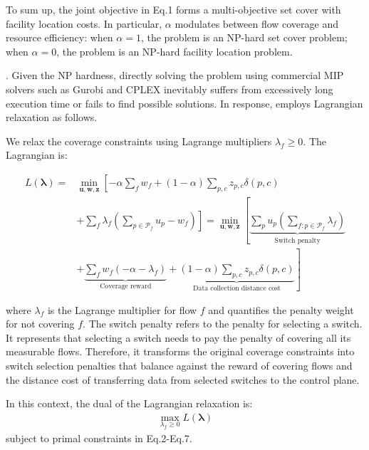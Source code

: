 To sum up, the joint objective in Eq.1 forms a multi-objective set cover with facility location costs. In particular, $\alpha$ modulates between flow coverage and resource efficiency: when $\alpha=1$, the problem is an NP-hard set cover problem; when $\alpha=0$, the problem is an NP-hard facility location problem.  

. Given the NP hardness, directly solving the problem using commercial MIP solvers such as Gurobi \cite{gurobi} and CPLEX \cite{cplex} inevitably suffers from excessively long execution time or fails to find possible solutions. In response, \sysname employs Lagrangian relaxation as follows.

We relax the coverage constraints using Lagrange multipliers \(\lambda_f \geq 0\). The Lagrangian is:

\vspace{-10pt}
{\footnotesize
\begin{align}
L(\boldsymbol{\lambda}) = &\min_{\mathbf{u},\mathbf{w},\mathbf{z}} \left[ 
-\alpha \sum_{f} w_f + (1-\alpha) \sum_{p,c} z_{p,c} \delta(p,c) \right. \nonumber \\ &\left. + \sum_{f} \lambda_f \left( \sum_{p \in \mathcal{P}_f} u_p - w_f \right)
\right] 
= \min_{\mathbf{u},\mathbf{w},\mathbf{z}} \left[ 
\underbrace{\sum_{p} u_p \left( \sum_{f: p \in \mathcal{P}_f} \lambda_f \right)}_{\text{Switch penalty}} \right. \nonumber \\ &+ \left.
\underbrace{\sum_{f} w_f (-\alpha - \lambda_f)}_{\text{Coverage reward}} +
\underbrace{(1-\alpha) \sum_{p,c} z_{p,c} \delta(p,c)}_{\text{Data collection distance cost}}
\right]
\end{align}}
\vspace{-7pt}

\noindent where $\lambda_f$ is the Lagrange multiplier for flow $f$ and quantifies the penalty weight for not covering $f$. The switch penalty refers to the penalty for selecting a switch. It represents that selecting a switch needs to pay the penalty of covering all its measurable flows. Therefore, it transforms the original coverage constraints into switch selection penalties that balance against the reward of covering flows and the distance cost of transferring data from selected switches to the control plane. 

In this context, the dual of the Lagrangian relaxation is:
\begin{align}
\max_{\lambda_f \geq 0} L(\boldsymbol{\lambda}) 
\end{align}
subject to primal constraints in Eq.2-Eq.7. 

